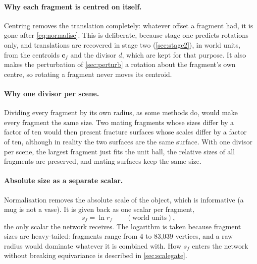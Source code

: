 \documentclass[11pt,a4paper]{article}
\theoremstyle{remark}
\begin{document}
\paragraph{Why each fragment is centred on itself.} Centring removes the translation completely: whatever offset a fragment had, it is gone after \cref{eq:normalise}. This is deliberate, because stage one predicts rotations only, and translations are recovered in stage two (\cref{sec:stage2}), in world units, from the centroids $\mathbf c_f$ and the divisor $d$, which are kept for that purpose. It also makes the perturbation of \cref{sec:perturb} a rotation about the fragment's own centre, so rotating a fragment never moves its centroid.

\paragraph{Why one divisor per scene.} Dividing every fragment by its own radius, as some methods do, would make every fragment the same size. Two mating fragments whose sizes differ by a factor of ten would then present fracture surfaces whose scales differ by a factor of ten, although in reality the two surfaces are the same surface. With one divisor per scene, the largest fragment just fits the unit ball, the relative sizes of all fragments are preserved, and mating surfaces keep the same size.

\paragraph{Absolute size as a separate scalar.} Normalisation removes the absolute scale of the object, which is informative (a mug is not a vase). It is given back as one scalar per fragment,
\begin{equation}
  s_f=\ln r_f\qquad(\text{world units}),
\end{equation}
the only scalar the network receives. The logarithm is taken because fragment sizes are heavy-tailed: fragments range from 4 to 83{,}039 vertices, and a raw radius would dominate whatever it is combined with. How $s_f$ enters the network without breaking equivariance is described in \cref{sec:scalegate}.
\end{document}
